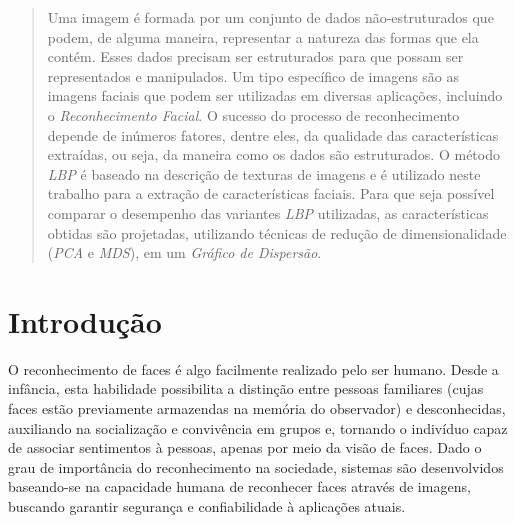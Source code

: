 \documentclass[conference]{IEEEtran}
\begin{document}
\maketitle

\begin{abstract}

Uma imagem é formada por um conjunto de dados não-estruturados que podem, de alguma maneira, representar a natureza das formas que ela contém. Esses dados precisam ser estruturados para que possam ser representados e manipulados. Um tipo específico de imagens são as imagens faciais que podem ser utilizadas em diversas aplicações, incluindo o \textit{Reconhecimento Facial}. O sucesso do processo de reconhecimento depende de inúmeros fatores, dentre eles, da qualidade das características extraídas, ou seja, da maneira como os dados são estruturados. O método \textit{LBP} é baseado na descrição de texturas de imagens e é utilizado neste trabalho para a extração de características faciais. Para que seja possível comparar o desempenho das variantes \textit{LBP} utilizadas, as características obtidas são projetadas, utilizando técnicas de redução de dimensionalidade (\textit{PCA} e \textit{MDS}), em um \textit{Gráfico de Dispersão}.  
     
\end{abstract}





%
\IEEEpeerreviewmaketitle



\section{Introdução}

O reconhecimento de faces é algo facilmente realizado pelo ser humano. Desde a infância, esta habilidade possibilita a distinção entre pessoas familiares (cujas faces estão previamente armazendas na memória do observador) e desconhecidas, auxiliando na socialização e convivência em grupos e, tornando o indivíduo capaz de associar sentimentos à pessoas, apenas por meio da visão de faces. Dado o grau de importância do reconhecimento na sociedade, sistemas são desenvolvidos baseando-se na capacidade humana de reconhecer faces através de imagens, buscando garantir segurança e confiabilidade à aplicações atuais. 
\end{document}
